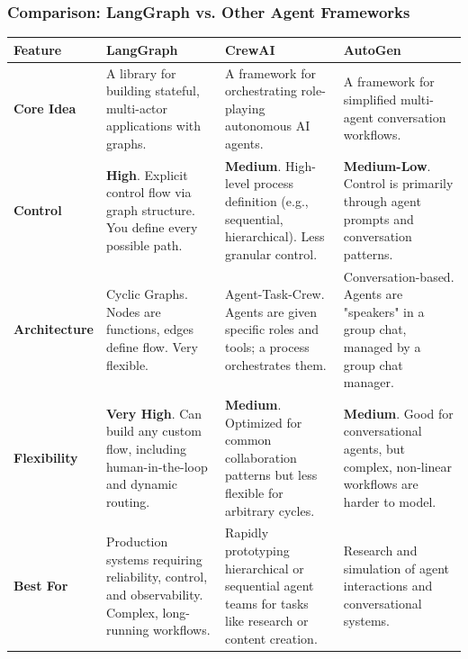 \begin{frame}[fragile]\frametitle{Comparison: LangGraph vs. Other Agent Frameworks}
\tiny
\begin{tabular}{|l|p{3.5cm}|p{3.5cm}|p{3.5cm}|}
\hline
\textbf{Feature} & \textbf{LangGraph} & \textbf{CrewAI} & \textbf{AutoGen} \\
\hline
\textbf{Core Idea} & A library for building stateful, multi-actor applications with graphs. & A framework for orchestrating role-playing autonomous AI agents. & A framework for simplified multi-agent conversation workflows. \\
\hline
\textbf{Control} & \textbf{High}. Explicit control flow via graph structure. You define every possible path. & \textbf{Medium}. High-level process definition (e.g., sequential, hierarchical). Less granular control. & \textbf{Medium-Low}. Control is primarily through agent prompts and conversation patterns. \\
\hline
\textbf{Architecture} & Cyclic Graphs. Nodes are functions, edges define flow. Very flexible. & Agent-Task-Crew. Agents are given specific roles and tools; a process orchestrates them. & Conversation-based. Agents are "speakers" in a group chat, managed by a group chat manager. \\
\hline
\textbf{Flexibility} & \textbf{Very High}. Can build any custom flow, including human-in-the-loop and dynamic routing. & \textbf{Medium}. Optimized for common collaboration patterns but less flexible for arbitrary cycles. & \textbf{Medium}. Good for conversational agents, but complex, non-linear workflows are harder to model. \\
\hline
\textbf{Best For} & Production systems requiring reliability, control, and observability. Complex, long-running workflows. & Rapidly prototyping hierarchical or sequential agent teams for tasks like research or content creation. & Research and simulation of agent interactions and conversational systems. \\
\hline
\end{tabular}
\end{frame}
